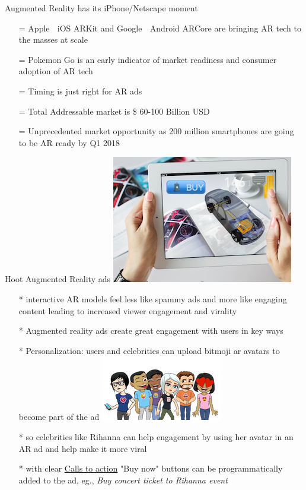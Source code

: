 \documentclass[12pt]{beamer}
\begin{document}
\begin{frame}[t]{Augmented Reality has its iPhone/Netscape moment}
  \begin{itemize}[<+-| alert@+>]
	\item[=]Apple 🍎
	 iOS ARKit and Google 🤖 Android ARCore are bringing AR tech to the masses at scale
	\item[=]Pokemon Go is an early indicator of market readiness and consumer adoption of AR tech
	\item[=]Timing is just right for AR ads
	\item[=]Total Addressable market is \$ 60-100 Billion USD 
	\item[=]Unprecedented market opportunity as 200 million smartphones are going to be AR ready by Q1 2018
\end{itemize}
\end{frame}
\begin{frame}[t]{Hoot Augmented Reality ads \includegraphics[scale=.1]{static/arad/arad5}} 
  \begin{itemize}[<+-| alert@+>]
\item[*]interactive AR models feel  less like spammy ads and more like engaging content leading to increased viewer engagement and virality 
\item[*]Augmented reality ads create great engagement with users in key ways
\item[*]Personalization: users and celebrities can upload bitmoji ar avatars to become part of the ad
\includegraphics[scale=.15]{static/arad/bitmoji} 
\item[*]so celebrities like Rihanna can help engagement by using her avatar in an AR ad and help make it more viral 
\item[*]with clear \underline{Calls to action} "Buy now" buttons can be programmatically added to the ad, eg., \emph{ Buy concert ticket to Rihanna event}
\end{itemize}
\end{frame}
\end{document}
